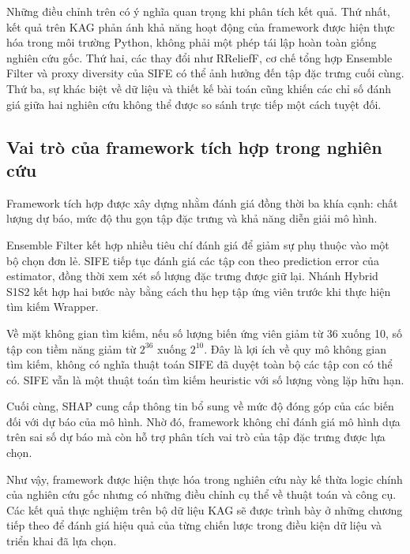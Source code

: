 Những điều chỉnh trên có ý nghĩa quan trọng khi phân tích kết quả.
Thứ nhất, kết quả trên KAG phản ánh khả năng hoạt động của framework
được hiện thực hóa trong môi trường Python, không phải một phép
tái lập hoàn toàn giống nghiên cứu gốc. Thứ hai, các thay đổi như
RReliefF, cơ chế tổng hợp Ensemble Filter và proxy diversity của
SIFE có thể ảnh hưởng đến tập đặc trưng cuối cùng. Thứ ba, sự
khác biệt về dữ liệu và thiết kế bài toán cũng khiến các chỉ số
đánh giá giữa hai nghiên cứu không thể được so sánh trực tiếp
một cách tuyệt đối.

\subsection{Vai trò của framework tích hợp trong nghiên cứu}
\label{subsec:integrated-framework-role}

Framework tích hợp được xây dựng nhằm đánh giá đồng thời ba khía
cạnh: chất lượng dự báo, mức độ thu gọn tập đặc trưng và khả năng
diễn giải mô hình.

Ensemble Filter kết hợp nhiều tiêu chí đánh giá để giảm sự phụ
thuộc vào một bộ chọn đơn lẻ. SIFE tiếp tục đánh giá các tập con
theo prediction error của estimator, đồng thời xem xét số lượng
đặc trưng được giữ lại. Nhánh Hybrid S1S2 kết hợp hai bước này
bằng cách thu hẹp tập ứng viên trước khi thực hiện tìm kiếm
Wrapper.

Về mặt không gian tìm kiếm, nếu số lượng biến ứng viên giảm từ
36 xuống 10, số tập con tiềm năng giảm từ $2^{36}$ xuống $2^{10}$.
Đây là lợi ích về quy mô không gian tìm kiếm, không có nghĩa
thuật toán SIFE đã duyệt toàn bộ các tập con có thể có. SIFE
vẫn là một thuật toán tìm kiếm heuristic với số lượng vòng lặp
hữu hạn.

Cuối cùng, SHAP cung cấp thông tin bổ sung về mức độ đóng góp
của các biến đối với dự báo của mô hình. Nhờ đó, framework
không chỉ đánh giá mô hình dựa trên sai số dự báo mà còn hỗ trợ
phân tích vai trò của tập đặc trưng được lựa chọn.

Như vậy, framework được hiện thực hóa trong nghiên cứu này
kế thừa logic chính của nghiên cứu gốc nhưng có những điều
chỉnh cụ thể về thuật toán và công cụ. Các kết quả thực nghiệm
trên bộ dữ liệu KAG sẽ được trình bày ở những chương tiếp theo
để đánh giá hiệu quả của từng chiến lược trong điều kiện dữ
liệu và triển khai đã lựa chọn.